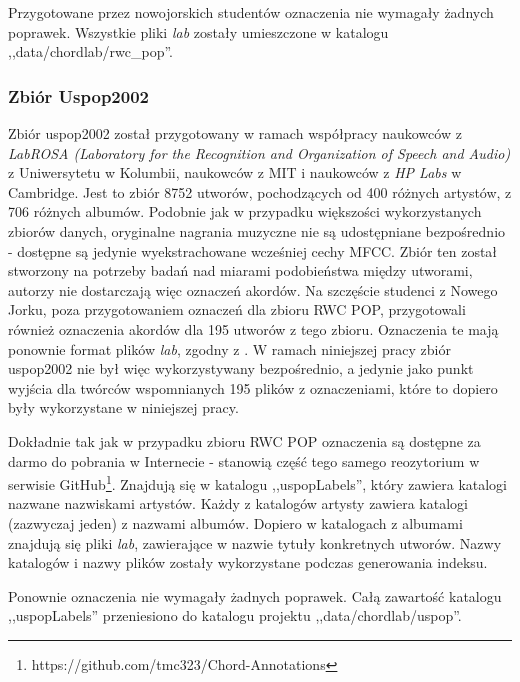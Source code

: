 Przygotowane przez nowojorskich studentów oznaczenia nie wymagały żadnych poprawek. Wszystkie pliki
\emph{lab} zostały umieszczone w katalogu ,,data/chordlab/rwc_pop''.

\subsubsection{Zbiór Uspop2002}

Zbiór uspop2002 \cite{berenzweig_large-scale_2004} został przygotowany w ramach współpracy naukowców
z \emph{LabROSA (Laboratory for the Recognition and Organization of Speech and Audio)} z
Uniwersytetu w Kolumbii, naukowców z MIT i naukowców z \emph{HP Labs} w Cambridge. Jest to zbiór
8752 utworów, pochodzących od 400 różnych artystów, z 706 różnych albumów. Podobnie jak w przypadku
większości wykorzystanych zbiorów danych, oryginalne nagrania muzyczne nie są udostępniane
bezpośrednio - dostępne są jedynie wyekstrachowane wcześniej cechy MFCC. Zbiór ten został stworzony
na potrzeby badań nad miarami podobieństwa między utworami, autorzy nie dostarczają więc oznaczeń
akordów. Na szczęście studenci z Nowego Jorku, poza przygotowaniem oznaczeń dla zbioru RWC POP,
przygotowali również oznaczenia akordów dla 195 utworów z tego zbioru. Oznaczenia te mają ponownie
format plików \emph{lab}, zgodny z \cite{harte_towards_nodate}. W ramach niniejszej pracy zbiór
uspop2002 nie był więc wykorzystywany bezpośrednio, a jedynie jako punkt wyjścia dla twórców
wspomnianych 195 plików z oznaczeniami, które to dopiero były wykorzystane w niniejszej pracy.

Dokładnie tak jak w przypadku zbioru RWC POP oznaczenia są dostępne za darmo do pobrania w
Internecie - stanowią część tego samego reozytorium w serwisie
GitHub\footnote{https://github.com/tmc323/Chord-Annotations}. Znajdują się w katalogu
,,uspopLabels'', który zawiera katalogi nazwane nazwiskami artystów. Każdy z katalogów artysty
zawiera katalogi (zazwyczaj jeden) z nazwami albumów. Dopiero w katalogach z albumami znajdują się
pliki \emph{lab}, zawierające w nazwie tytuły konkretnych utworów. Nazwy katalogów i nazwy plików
zostały wykorzystane podczas generowania indeksu.

Ponownie oznaczenia nie wymagały żadnych poprawek. Całą zawartość katalogu ,,uspopLabels''
przeniesiono do katalogu projektu ,,data/chordlab/uspop''.

